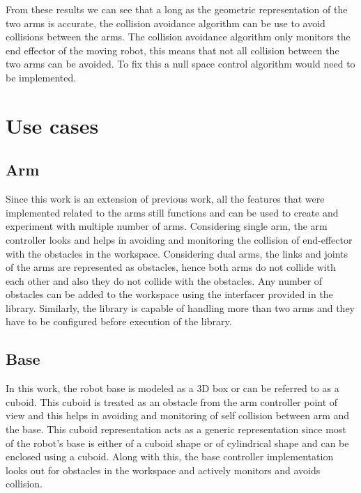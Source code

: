 \documentclass[a4paper, 11.5pt, conference]{ieeeconf}      %
\begin{document}
From these results we can see that a long as the geometric representation of the two arms is accurate, the collision avoidance algorithm can be use to avoid collisions between the arms. The collision avoidance algorithm only monitors the end effector of the moving robot, this means that not all collision between the two arms can be avoided. To fix this a null space control algorithm would need to be implemented. 

\section{Use cases}

\subsection{Arm}
Since this work is an extension of previous work, all the features that were implemented related to the arms still functions and can be used to create and experiment with multiple number of arms. Considering single arm, the arm controller looks and helps in avoiding and monitoring the collision of end-effector with the obstacles in the workspace. Considering dual arms, the links and joints of the arms are represented as obstacles, hence both arms do not collide with each other and also they do not collide with the obstacles. Any number of obstacles can be added to the workspace using the interfacer provided in the library. Similarly, the library is capable of handling more than two arms and they have to be configured before execution of the library.

\subsection{Base}
In this work, the robot base is modeled as a 3D box or can be referred to as a cuboid. This cuboid is treated as an obstacle from the arm controller point of view and this helps in avoiding and monitoring of self collision between arm and the base. This cuboid representation acts as a generic representation since most of the robot's base is either of a cuboid shape or of cylindrical shape and can be enclosed using a cuboid. Along with this, the base controller implementation looks out for obstacles in the workspace and actively monitors and avoids collision.
\end{document}
